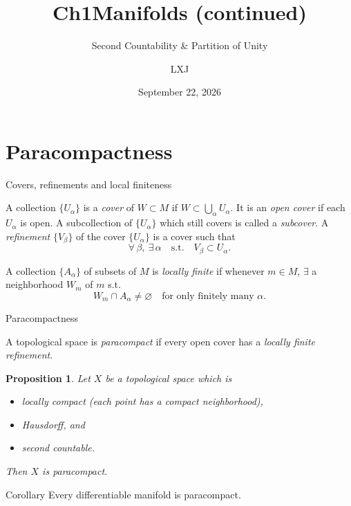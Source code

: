 \documentclass[10pt]{beamer}
\title{Ch1\quad Manifolds (continued)}
\subtitle{Second Countability \& Partition of Unity}
\date{September 22, 2026}
\author{LXJ}
\newtheorem{proposition}{Proposition}
\begin{document}
\maketitle

\section{Paracompactness}

\begin{frame}{Covers, refinements and local finiteness}
	\begin{definition}
		A collection $\{U_\alpha\}$ is a \emph{cover} of $W \subset M$ if
		$W \subset \bigcup_\alpha U_\alpha$. It is an \emph{open cover} if each
		$U_\alpha$ is open. A subcollection of $\{U_\alpha\}$ which still
		covers is called a \emph{subcover}. A \emph{refinement} $\{V_\beta\}$
		of the cover $\{U_\alpha\}$ is a cover such that
		\[
			\forall\, \beta,\ \exists\, \alpha \quad \text{s.t.}\quad
			V_\beta \subset U_\alpha .
		\]
	\end{definition}
	\begin{definition}
		A collection $\{A_\alpha\}$ of subsets of $M$ is \emph{locally finite}
		if whenever $m \in M$, $\exists$ a neighborhood $W_m$ of $m$ s.t.\
		\[
			W_m \cap A_\alpha \neq \varnothing
			\quad\text{for only finitely many } \alpha .
		\]
	\end{definition}
\end{frame}

\begin{frame}{Paracompactness}
	\begin{definition}[Paracompact]
		A topological space is \emph{paracompact} if every open cover has a
		\emph{locally finite refinement}.
	\end{definition}
	\begin{proposition}
		Let $X$ be a topological space which is
		\begin{itemize}
			\item \emph{locally compact} (each point has a compact
			      neighborhood),
			\item \emph{Hausdorff}, and
			\item \emph{second countable}.
		\end{itemize}
		Then $X$ is paracompact.
	\end{proposition}
	\begin{alertblock}{Corollary}
		Every differentiable manifold is paracompact.
	\end{alertblock}
\end{frame}
\end{document}

